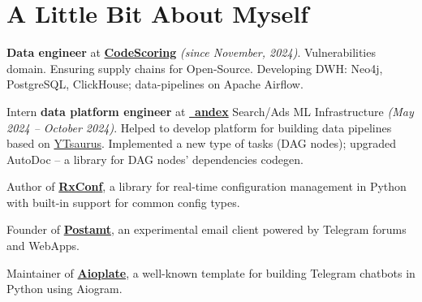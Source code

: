\documentclass[a4paper,11pt]{article}
\newcommand{\MySkip}{
\vskip10pt
}
\begin{document}
\begin{adjustbox}{valign=t}
\begin{minipage}{0.65\textwidth}
\section*{A Little Bit About Myself}
\begin{flushleft}

\textbf{Data engineer} at \textbf{\href{https://codescoring.ru/}{CodeScoring}} \textit{(since November, 2024)}. Vulnerabilities domain.
Ensuring supply chains for Open-Source. Developing DWH: Neo4j, PostgreSQL, ClickHouse; data-pipelines on Apache Airflow.

\MySkip

Intern \textbf{data platform engineer} at \href{https://ya.ru}{~\hspace{-0.40em}\textbf{andex}} Search/Ads ML Infrastructure \textit{(May 2024 -- October 2024)}. Helped to develop platform for building data pipelines based on \href{https://github.com/ytsaurus/ytsaurus}{YTsaurus}. Implemented a new type of tasks (DAG nodes); upgraded AutoDoc -- a library for DAG nodes' dependencies codegen.

\MySkip

Author of \href{https://realkarych.github.io/rxconf/}{\textbf{RxConf}}, a library for real-time configuration management in Python with built-in support for common config types.

\MySkip

Founder of \hspace{0.3em}\href{https://github.com/realkarych/postamt/}{ \hspace{-0.1em}\textbf{Postamt}}, an experimental email client powered by Telegram forums and WebApps.

\MySkip

Maintainer of \hspace{0.2em}\href{https://github.com/realkarych/aioplate/}{\faGithub\hspace{0.1em}\textbf{Aioplate}}, a well-known template for building Telegram chatbots in Python using Aiogram.


\end{flushleft}
\end{minipage}
\end{adjustbox}
\end{document}
